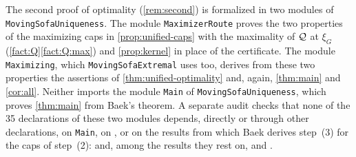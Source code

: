 The second proof of optimality (\cref{rem:second}) is formalized in two modules
of \texttt{MovingSofaUniqueness}. The module \texttt{MaximizerRoute} proves the
two properties of the maximizing caps in \cref{prop:unified-caps} with the
maximality of $\mathcal{Q}$ at $\xi_G$ (\cref{fact:Q}\ref{fact:Q:max}) and
\cref{prop:kernel} in place of the certificate. The module
\texttt{Maximizing}, which \texttt{MovingSofaExtremal} uses too, derives from
these two properties the assertions of \cref{thm:unified-optimality} and, again,
\cref{thm:main} and \cref{cor:all}. Neither imports the module
\texttt{Main} of \texttt{MovingSofaUniqueness}, which proves \cref{thm:main}
from Baek's theorem.
A separate audit checks that none of the 35 declarations of these two modules
depends, directly or through other declarations, on \texttt{Main}, on
, or on the results from which Baek derives step~(3) for the
caps of step~(2):
 and, among the results they rest on,
 and
.

